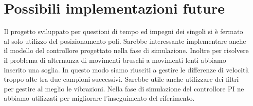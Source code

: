 \documentclass{article}
\begin{document}
\section{Possibili implementazioni future}
Il progetto sviluppato per questioni di tempo ed impegni dei singoli si è fermato al solo utilizzo del posizionamento poli. Sarebbe interessante implementare anche il modello del controllore progettato nella fase di simulazione. Inoltre per risolvere il problema di alternanza di movimenti bruschi a movimenti lenti abbiamo inserito una soglia. In questo modo siamo riusciti a gestire le differenze di velocità troppo alte tra due campioni successivi. Sarebbe utile anche utilizzare dei filtri per gestire al meglio le vibrazioni. Nella fase di simulazione del controllore PI ne abbiamo utilizzati per migliorare l'inseguimento del riferimento.
\end{document}
